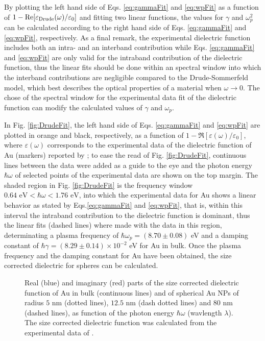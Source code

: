 %
%
By plotting the left hand side of Eqs. \eqref{eq:gammaFit} and \eqref{eq:wpFit} as a function of  $1-\Re[\varepsilon_\text{\scriptsize Drude}(\omega)/\varepsilon_0]$ and fitting two linear functions, the values for $\gamma$ and $\omega_p^2$ can be calculated according to the right hand side of Eqs. \eqref{eq:gammaFit} and \eqref{eq:wpFit}, respectively. As a final remark, the experimental dielectric function includes both an intra- and an interband contribution  while  Eqs. \eqref{eq:gammaFit} and \eqref{eq:wpFit} are only valid for the intraband contribution of the dielectric function, thus the linear fits should be done within an spectral window into which the interband contributions are negligible compared to the Drude-Sommerfeld model, which best describes the optical properties of a material  when $\omega\to 0$. The  chose of the spectral window for the experimental data fit of the dielectric function can modify the calculated values of $\gamma$ and $\omega_p$.
%


 In Fig. \ref{fig:DrudeFit}, the left hand side of Eqs. \eqref{eq:gammaFit}  and \eqref{eq:wpFit} are plotted in orange and black, respectively, as a function of $1-\Re[\varepsilon(\omega)/ \varepsilon_0]$, where $\varepsilon(\omega)$  corresponds to the experimental data of the dielectric function of Au (markers) reported by \citeauthor{johnson_optical_1972} \cite{johnson_optical_1972}; to ease the read of Fig. \ref{fig:DrudeFit}, continuous lines between the data were added as a guide to the eye and the photon energy $\hbar\omega$ of selected points of the experimental data are shown on the top margin. The shaded region in Fig. \ref{fig:DrudeFit} is the frequency window $0.64\text{ eV} < \hbar\omega < 1.76 \text{ eV}$, into which the experimental data for Au shows a linear behavior as stated by Eqs.\eqref{eq:gammaFit}  and \eqref{eq:wpFit}, that is, within this interval  the intraband contribution to the dielectric function is dominant, thus the linear fits (dashed lines) where made with the data in this region, determinating a plasma frequency of $\hbar\omega_p =(8.70\pm0.08)$ eV and a damping constant of $\hbar\gamma = (8.29 \pm 0.14)\times 10^{-2}$ eV for Au in bulk. Once the plasma frequency and the damping constant for Au have been obtained, the size corrected dielectric for spheres can be calculated. 

	\begin{figure}[b!]
	\def\svgwidth{.85\textwidth} \centering \small
	\caption[Au size corrected dielectric function]{ Real (blue) and imaginary (red) parts of the size corrected dielectric function of Au in bulk (continuous lines) and  of spherical Au NPs of radius $5$ nm (dotted lines), $12.5$ nm (dash dotted lines) and $80$ nm (dashed lines), as function of the photon energy $\hbar\omega$ (wavlength $\lambda$). The size corrected dielectric function was calculated from the experimental data of \citeauthor{johnson_optical_1972} \cite{johnson_optical_1972}. }
	\label{fig:EpsSize}
	\end{figure}


